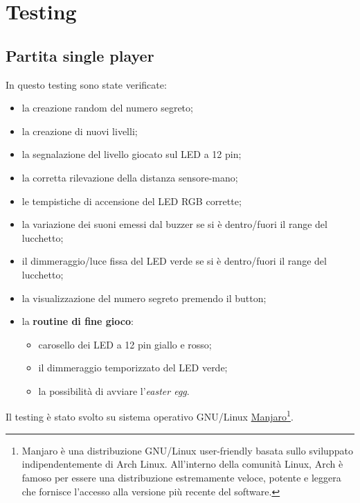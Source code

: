 \chapter{Testing}

\section{Partita single player}
In questo testing sono state verificate:
\begin{itemize}
	\item la creazione random del numero segreto;
	\item la creazione di nuovi livelli;
	\item la segnalazione del livello giocato sul LED a 12 pin;
	\item la corretta rilevazione della distanza sensore-mano;
	\item le tempistiche di accensione del LED RGB corrette;
	\item la variazione dei suoni emessi dal buzzer se si è dentro/fuori il range del lucchetto;
	\item il dimmeraggio/luce fissa del LED verde se si è dentro/fuori il range del lucchetto;
	\item la visualizzazione del numero segreto premendo il button;
	\item la \textbf{routine di fine gioco}:
	\begin{itemize}
		\item carosello dei LED a 12 pin giallo e rosso;
		\item il dimmeraggio temporizzato del LED verde;
		\item la possibilità di avviare l'\textit{easter egg}.
	\end{itemize}
\end{itemize}

Il testing è stato svolto su sistema operativo GNU/Linux \href{https://manjaro.github.io/}{Manjaro}\footnote{Manjaro è una distribuzione GNU/Linux user-friendly basata sullo sviluppato indipendentemente di Arch Linux. All'interno della comunità Linux, Arch è famoso per essere una distribuzione estremamente veloce, potente e leggera che fornisce l'accesso alla versione più recente del software.}.

